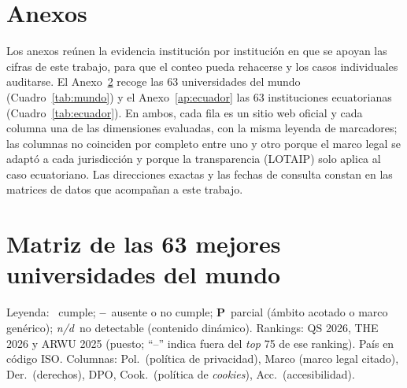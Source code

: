 \documentclass[pdflatex,sn-basic,Numbered]{sn-jnl}
\newcommand{\si}{\ding{51}}
\newcommand{\no}{\textcolor{gris}{\textbf{--}}}
\newcommand{\nd}{\textsl{\footnotesize n/d}}
\theoremstyle{thmstyleone}
\theoremstyle{thmstyletwo}
\theoremstyle{thmstylethree}
\begin{document}
\begin{appendices}
\section{Anexos}
Los anexos reúnen la evidencia institución por institución en que se apoyan las cifras de este trabajo, para que el conteo pueda rehacerse y los casos individuales auditarse. El Anexo~\ref{ap:mundo} recoge las 63 universidades del mundo (Cuadro~\ref{tab:mundo}) y el Anexo~\ref{ap:ecuador} las 63 instituciones ecuatorianas (Cuadro~\ref{tab:ecuador}). En ambos, cada fila es un sitio web oficial y cada columna una de las dimensiones evaluadas, con la misma leyenda de marcadores; las columnas no coinciden por completo entre uno y otro porque el marco legal se adaptó a cada jurisdicción y porque la transparencia (LOTAIP) solo aplica al caso ecuatoriano. Las direcciones exactas y las fechas de consulta constan en las matrices de datos que acompañan a este trabajo.

\section{Matriz de las 63 mejores universidades del mundo}
\label{ap:mundo}
Leyenda: \si~cumple; \no~ausente o no cumple; \textbf{P}~parcial (\'ambito acotado o marco gen\'erico); \nd~no detectable (contenido din\'amico). Rankings: QS 2026, THE 2026 y ARWU 2025 (puesto; ``--'' indica fuera del \emph{top} 75 de ese ranking). Pa\'is en c\'odigo ISO. Columnas: Pol.\ (pol\'itica de privacidad), Marco (marco legal citado), Der.\ (derechos), DPO, Cook.\ (pol\'itica de \emph{cookies}), Acc.\ (accesibilidad).


\end{appendices}
\end{document}
